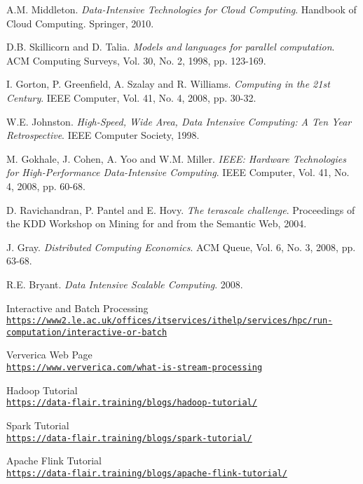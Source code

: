 \begin{thebibliography}{9}

A.M. Middleton.
\textit{Data-Intensive Technologies for Cloud Computing}. 
Handbook of Cloud Computing. Springer, 2010.

D.B. Skillicorn and D. Talia.
\textit{Models and languages for parallel computation}. 
ACM Computing Surveys, Vol. 30, No. 2, 1998, pp. 123-169.

I. Gorton, P. Greenfield, A. Szalay and R. Williams.
\textit{Computing in the 21st Century}. 
IEEE Computer, Vol. 41, No. 4, 2008, pp. 30-32.

W.E. Johnston.
\textit{High-Speed, Wide Area, Data Intensive Computing: A Ten Year Retrospective}. 
IEEE Computer Society, 1998.

M. Gokhale, J. Cohen, A. Yoo and W.M. Miller.
\textit{IEEE: Hardware Technologies for High-Performance Data-Intensive Computing}. 
IEEE Computer, Vol. 41, No. 4, 2008, pp. 60-68.

D. Ravichandran, P. Pantel and E. Hovy.
\textit{The terascale challenge}. 
Proceedings of the KDD Workshop on Mining for and from the Semantic Web, 2004.

J. Gray.
\textit{Distributed Computing Economics}. 
ACM Queue, Vol. 6, No. 3, 2008, pp. 63-68.

R.E. Bryant.
\textit{Data Intensive Scalable Computing}. 
2008.

Interactive and Batch Processing
\\\texttt{\url{https://www2.le.ac.uk/offices/itservices/ithelp/services/hpc/run-computation/interactive-or-batch}}

Ververica Web Page
\\\texttt{\url{https://www.ververica.com/what-is-stream-processing}}

Hadoop Tutorial
\\\texttt{\url{https://data-flair.training/blogs/hadoop-tutorial/}}

Spark Tutorial
\\\texttt{\url{https://data-flair.training/blogs/spark-tutorial/}}

Apache Flink Tutorial
\\\texttt{\url{https://data-flair.training/blogs/apache-flink-tutorial/}}


\end{thebibliography}
